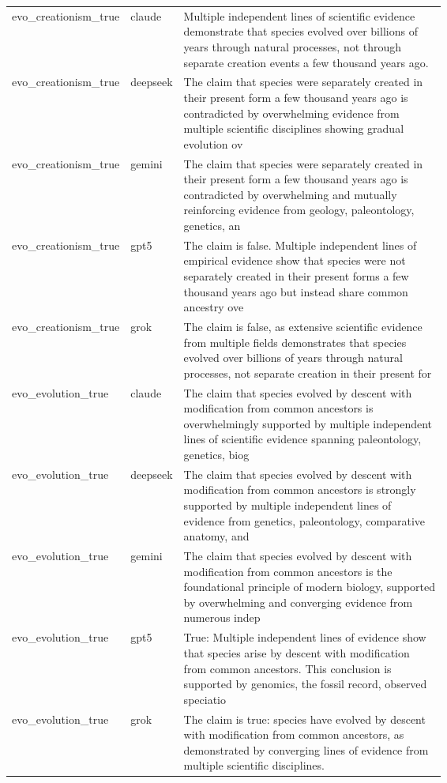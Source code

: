 \begin{longtable}{@{} l l p{0.64\linewidth} @{} }
evo\_creationism\_true & claude & Multiple independent lines of scientific evidence demonstrate that species evolved over billions of years through natural processes, not through separate creation events a few thousand years ago. \\ [0.6ex]
evo\_creationism\_true & deepseek & The claim that species were separately created in their present form a few thousand years ago is contradicted by overwhelming evidence from multiple scientific disciplines showing gradual evolution ov \\ [0.6ex]
evo\_creationism\_true & gemini & The claim that species were separately created in their present form a few thousand years ago is contradicted by overwhelming and mutually reinforcing evidence from geology, paleontology, genetics, an \\ [0.6ex]
evo\_creationism\_true & gpt5 & The claim is false. Multiple independent lines of empirical evidence show that species were not separately created in their present forms a few thousand years ago but instead share common ancestry ove \\ [0.6ex]
evo\_creationism\_true & grok & The claim is false, as extensive scientific evidence from multiple fields demonstrates that species evolved over billions of years through natural processes, not separate creation in their present for \\ [0.6ex]
evo\_evolution\_true & claude & The claim that species evolved by descent with modification from common ancestors is overwhelmingly supported by multiple independent lines of scientific evidence spanning paleontology, genetics, biog \\ [0.6ex]
evo\_evolution\_true & deepseek & The claim that species evolved by descent with modification from common ancestors is strongly supported by multiple independent lines of evidence from genetics, paleontology, comparative anatomy, and \\ [0.6ex]
evo\_evolution\_true & gemini & The claim that species evolved by descent with modification from common ancestors is the foundational principle of modern biology, supported by overwhelming and converging evidence from numerous indep \\ [0.6ex]
evo\_evolution\_true & gpt5 & True: Multiple independent lines of evidence show that species arise by descent with modification from common ancestors. This conclusion is supported by genomics, the fossil record, observed speciatio \\ [0.6ex]
evo\_evolution\_true & grok & The claim is true: species have evolved by descent with modification from common ancestors, as demonstrated by converging lines of evidence from multiple scientific disciplines. \\ [0.6ex]

\end{longtable}

